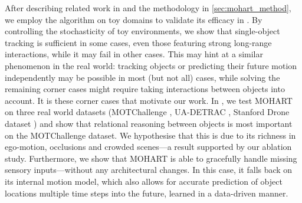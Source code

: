 After describing related work in  and the methodology in \cref{sec:mohart_method}, we employ the algorithm on toy domains to validate its efficacy in . By controlling the stochasticity of toy environments, we show that single-object tracking is sufficient in some cases, even those featuring strong long-range interactions, while it may fail in other cases.
This may hint at a similar phenomenon in the real world: tracking objects or predicting their future motion independently may be possible in most (but not all) cases, while solving the remaining corner cases might require taking interactions between objects into account.
It is these corner cases that motivate our work.
In , we test \gls{MOHART} on three real world datasets (MOTChallenge \cite{Mot16}, UA-DETRAC \cite{Wen15}, Stanford Drone dataset \cite{Dronedataset}) and show that relational reasoning between objects is most important on the MOTChallenge dataset. We hypothesise that this is due to its richness in ego-motion, occlusions and crowded scenes---a result supported by our ablation study. Furthermore, we show that \gls{MOHART} is able to gracefully handle missing sensory inputs---without any architectural changes. In this case, it falls back on its internal motion model, which also allows for accurate prediction of object locations multiple time steps into the future, learned in a data-driven manner.


